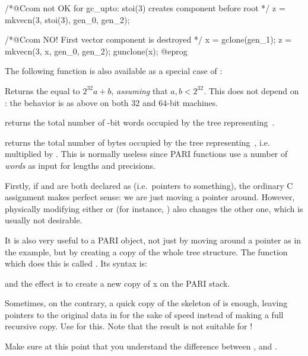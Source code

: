   /*@Ccom not OK for gc\_upto: stoi(3) creates component before root */
  z = mkvecn(3, stoi(3), gen_0, gen_2);

  /*@Ccom NO! First vector component  is destroyed */
  x = gclone(gen_1);
  z = mkvecn(3, x, gen_0, gen_2);
  gunclone(x);
@eprog

\noindent The following function is also available as a special case of
:


Returns the  equal to $2^{32} a + b$, \emph{assuming} that
$a,b < 2^{32}$. This does not depend on : the behavior is
as above on both $32$ and $64$-bit machines.


 returns the total number of \B-bit words occupied
by the tree representing~.

 returns the total number of bytes occupied
by the tree representing~, i.e.~ multiplied by
. This is normally useless since PARI functions use
a number of \emph{words} as input for lengths and precisions.

Firstly, if  and  are both declared as  (i.e.~pointers
to something), the ordinary C assignment  makes perfect sense: we
are just moving a pointer around. However, physically modifying either
 or  (for instance, ) also changes the other
one, which is usually not desirable.

It is also very useful to  a PARI object, not just by moving around
a pointer as in the  example, but by creating a copy of the whole
tree structure. The function which does this is called . Its
syntax is:


\noindent and the effect is to create a new copy of x on the PARI stack.

Sometimes, on the contrary, a quick copy of the skeleton of  is
enough, leaving pointers to the original data in  for the sake of
speed instead of making a full recursive copy. Use
 for this. Note that the result is not suitable
for  !

Make sure at this point that you understand the difference between
,  and .

